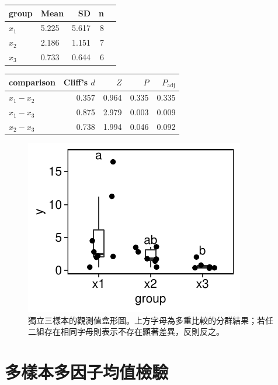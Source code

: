 \documentclass[12pt]{article}
\begin{document}
\begin{table}[htbp]
	\centering
	\begin{tabular}{llrrr}
		\hline
		group & Mean & SD & n \\ 
		\hline
		$x_1$ & 5.225 & 5.617 &    8 \\ 
		$x_2$ & 2.186 & 1.151 &    7 \\ 
		$x_3$ & 0.733 & 0.644 &    6 \\ 
		\hline
	\end{tabular}
	\label{table:rank_oneway}
\end{table}

\begin{table}[htbp]
	\centering
	\begin{tabular}{lrrrr}
	\hline
	comparison & Cliff's $d$ & $Z$ & $P$ & $P_{\mathrm{adj}}$ \\ 
	\hline
	$x_1 - x_2$ & 0.357 & 0.964 & 0.335 & 0.335 \\ 
	$x_1 - x_3$ & 0.875 & 2.979 & 0.003 & 0.009 \\ 
	$x_2 - x_3$ & 0.738 & 1.994 & 0.046 & 0.092 \\ 
	\hline
	\end{tabular}

	\label{table:rank_oneway_post}
\end{table}

\begin{figure}[htbp]
	\centering
	\includegraphics[]{rank_oneway.pdf}
	\caption{獨立三樣本的觀測值盒形圖。上方字母為多重比較的分群結果；若任二組存在相同字母則表示不存在顯著差異，反則反之。}
	\label{fig:rank_oneway}
\end{figure}

\section{多樣本多因子均值檢驗}
\end{document}
